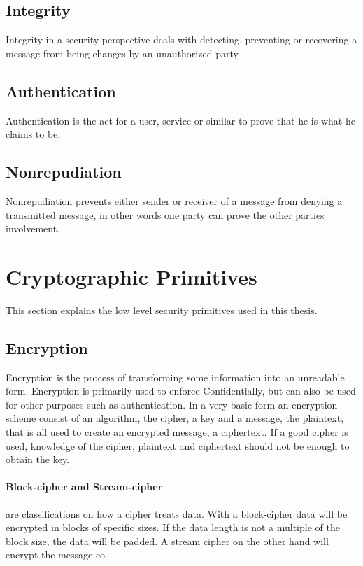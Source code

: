 \documentclass[english,12pt,a4paper]{book}
\begin{document}
\subsection{Integrity}
Integrity in a security perspective deals with detecting, preventing or
recovering a message from being changes by an unauthorized party \cite[p.
18]{stallings}.

\subsection{Authentication}
Authentication is the act for a user, service or similar to prove that he is
what he claims to be\cite[p. 18]{stallings}. 

\subsection{Nonrepudiation}
Nonrepudiation prevents either sender or receiver of a message from denying a
transmitted message, in other words one party can prove the other parties
involvement\cite[p. 19]{stallings}.

\section{Cryptographic Primitives}
This section explains the low level security primitives used in this thesis.

\subsection{Encryption}
Encryption is the process of transforming some information into an unreadable
form. Encryption is primarily used to enforce Confidentially, but can also be
used for other purposes such as authentication. In a very basic form an
encryption scheme consist of an algorithm, the cipher, a key and a message, the
plaintext, that is all used to create an encrypted message, a ciphertext. If
a good cipher is used, knowledge of the cipher, plaintext and ciphertext should
not be enough to obtain the key.

\paragraph{Block-cipher and Stream-cipher} are classifications on how a cipher
treats data\cite[p. 32]{stallings}. With a block-cipher data will be encrypted
in blocks of specific sizes. If the data length is not a multiple of the block
size, the data will be padded. A stream cipher on the other hand will encrypt
the message co.
\end{document}
